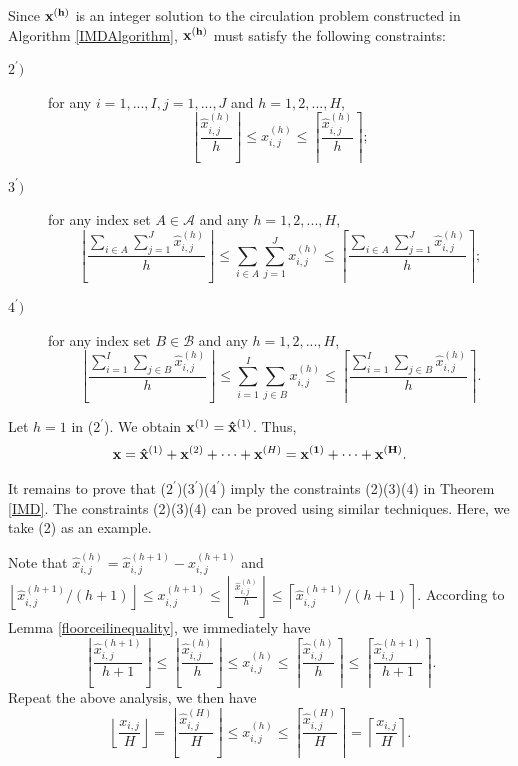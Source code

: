 \documentclass[letterpaper,twocolumn,10pt]{article}
\begin{document}
Since $\bf x^{(h)}$ is an integer solution to the circulation problem constructed in Algorithm \ref{IMDAlgorithm}, $\bf x^{(h)}$ must satisfy the following constraints:
\begin{description}
  \item[$2^{\prime})$] for any $i=1,...,I, j=1,...,J$ and $h=1,2,...,H$,
   $$\left\lfloor \frac{\hat{x}^{(h)}_{i,j}}{h}\right\rfloor\leq x^{(h)}_{i,j}\leq \left\lceil \frac{\hat{x}^{(h)}_{i,j}}{h}\right\rceil;$$
  \item[$3^{\prime})$] for any index set $A\in \mathcal{A}$ and any $h=1,2,...,H$,
   $$\left\lfloor \frac{\sum_{i\in A}\sum_{j=1}^J \hat{x}^{(h)}_{i,j}}{h}\right\rfloor\leq\sum_{i\in A}\sum_{j=1}^J x^{(h)}_{i,j}\leq \left\lceil \frac{\sum_{i\in A}\sum_{j=1}^J \hat{x}^{(h)}_{i,j}}{h}\right\rceil;$$
  \item[$4^{\prime})$] for any index set $B\in \mathcal{B}$ and any $h=1,2,...,H$,
   $$\left\lfloor \frac{\sum_{i=1}^I\sum_{j\in B} \hat{x}^{(h)}_{i,j}}{h}\right\rfloor\leq\sum_{i=1}^I\sum_{j\in B} x^{(h)}_{i,j}\leq \left\lceil \frac{\sum_{i=1}^I\sum_{j\in B} \hat{x}^{(h)}_{i,j}}{h}\right\rceil.$$
\end{description}

Let $h=1$ in ($2^{\prime}$). We obtain ${\bf x}^{(1)} = {\bf \hat{x}}^{(1)}$. Thus,
$${\bf x}= {\bf \hat{x}}^{(1)} + {\bf x}^{(2)} + \cdots + {\bf x}^{(H)} = {\bf x^{(1)}+\cdots+x^{(H)}}.$$

It remains to prove that ($2^{\prime}$)($3^{\prime}$)($4^{\prime}$) imply the constraints (2)(3)(4) in Theorem \ref{IMD}. The constraints (2)(3)(4) can be proved using similar techniques. Here, we take (2) as an example.

Note that $\hat{x}^{(h)}_{i,j} = \hat{x}^{(h+1)}_{i,j} - x^{(h+1)}_{i,j}$ and $\left\lfloor \hat{x}^{(h+1)}_{i,j}/(h+1)\right\rfloor\leq x^{(h+1)}_{i,j}\leq \left\lfloor \frac{\hat{x}^{(h)}_{i,j}}{h}\right\rfloor\leq \left\lceil \hat{x}^{(h+1)}_{i,j}/(h+1)\right\rceil$. According to Lemma \ref{floorceilinequality}, we immediately have
$$\left\lfloor \frac{\hat{x}^{(h+1)}_{i,j}}{h+1}\right\rfloor \leq \left\lfloor \frac{\hat{x}^{(h)}_{i,j}}{h}\right\rfloor\leq x^{(h)}_{i,j}\leq \left\lceil \frac{\hat{x}^{(h)}_{i,j}}{h}\right\rceil \leq \left\lceil \frac{\hat{x}^{(h+1)}_{i,j}}{h+1}\right\rceil.$$
Repeat the above analysis, we then have
$$\left\lfloor \frac{x_{i,j}}{H}\right\rfloor = \left\lfloor \frac{\hat{x}^{(H)}_{i,j}}{H}\right\rfloor\leq x^{(h)}_{i,j}\leq \left\lceil \frac{\hat{x}^{(H)}_{i,j}}{H}\right\rceil = \left\lceil \frac{x_{i,j}}{H}\right\rceil.$$
\end{document}
